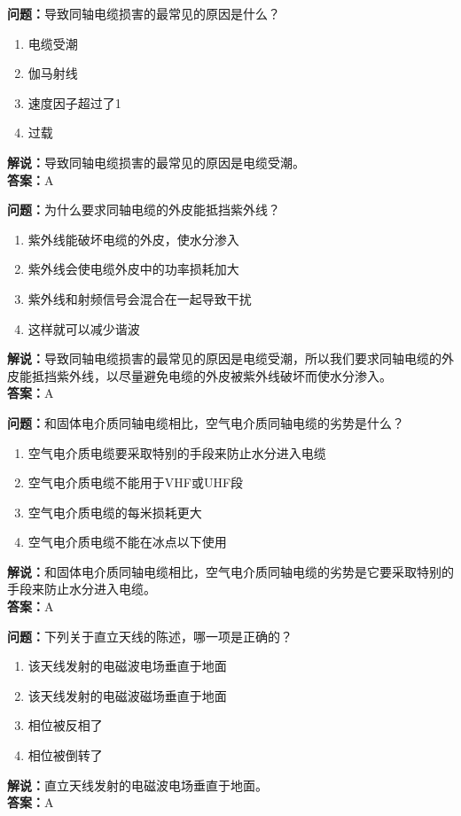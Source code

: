 \documentclass{ctexbook}%
\begin{document}
\textbf{问题：}导致同轴电缆损害的最常见的原因是什么？
\begin{enumerate}[label=\Alph*), leftmargin=3em]
\item 电缆受潮
\item 伽马射线
\item 速度因子超过了1
\item 过载
\end{enumerate}
\textbf{解说：}导致同轴电缆损害的最常见的原因是电缆受潮。\\
\textbf{答案：}A

\textbf{问题：}为什么要求同轴电缆的外皮能抵挡紫外线？
\begin{enumerate}[label=\Alph*), leftmargin=3em]
\item 紫外线能破坏电缆的外皮，使水分渗入
\item 紫外线会使电缆外皮中的功率损耗加大
\item 紫外线和射频信号会混合在一起导致干扰
\item 这样就可以减少谐波
\end{enumerate}
\textbf{解说：}导致同轴电缆损害的最常见的原因是电缆受潮，所以我们要求同轴电缆的外皮能抵挡紫外线，以尽量避免电缆的外皮被紫外线破坏而使水分渗入。\\
\textbf{答案：}A

\textbf{问题：}和固体电介质同轴电缆相比，空气电介质同轴电缆的劣势是什么？
\begin{enumerate}[label=\Alph*), leftmargin=3em]
\item 空气电介质电缆要采取特别的手段来防止水分进入电缆
\item 空气电介质电缆不能用于VHF或UHF段
\item 空气电介质电缆的每米损耗更大
\item 空气电介质电缆不能在冰点以下使用
\end{enumerate}
\textbf{解说：}和固体电介质同轴电缆相比，空气电介质同轴电缆的劣势是它要采取特别的手段来防止水分进入电缆。\\
\textbf{答案：}A

\textbf{问题：}下列关于直立天线的陈述，哪一项是正确的？
\begin{enumerate}[label=\Alph*), leftmargin=3em]
\item 该天线发射的电磁波电场垂直于地面
\item 该天线发射的电磁波磁场垂直于地面
\item 相位被反相了
\item 相位被倒转了
\end{enumerate}
\textbf{解说：}直立天线发射的电磁波电场垂直于地面。\\
\textbf{答案：}A
\end{document}
